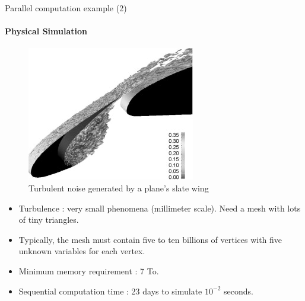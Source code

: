 \documentclass[compress,10pt,aspectratio=169]{beamer}
\begin{document}
\begin{frame}[fragile]{Parallel computation example (2)}
    \framesubtitle{Physical Simulation}
    \small
    \begin{multicols}{2}
        \begin{figure}[h]
            \includegraphics[width=.6\linewidth]{../Images/SlatWingTurb1.jpg}
            \caption{Turbulent noise generated by a plane's slate wing}
        \end{figure}

        \begin{itemize}
            \item Turbulence : very small phenomena (millimeter scale). Need a mesh with lots of tiny triangles.
            \item Typically, the mesh must contain five to ten billions of vertices with five unknown variables for each vertex.
            \item Minimum memory requirement : 7 To.
            \item Sequential computation time : 23 days to simulate $10^{-2}$ seconds.
        \end{itemize}
    \end{multicols}
\end{frame}
\end{document}
